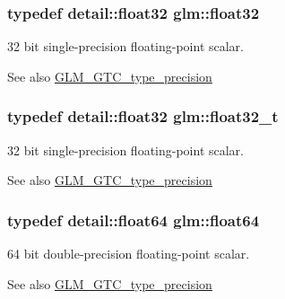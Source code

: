 \subsubsection[{float32}]{\setlength{\rightskip}{0pt plus 5cm}typedef detail\+::float32 {\bf glm\+::float32}}\label{group__gtc__type__precision_ga814f2f65354b6588b067cc5c67a6b340}
32 bit single-\/precision floating-\/point scalar. \begin{DoxySeeAlso}{See also}
\hyperlink{group__gtc__type__precision}{G\+L\+M\+\_\+\+G\+T\+C\+\_\+type\+\_\+precision} 
\end{DoxySeeAlso}
\hypertarget{group__gtc__type__precision_ga642737ae3e7c434b366f2191e6944bf2}{}
\subsubsection[{float32\+\_\+t}]{\setlength{\rightskip}{0pt plus 5cm}typedef detail\+::float32 {\bf glm\+::float32\+\_\+t}}\label{group__gtc__type__precision_ga642737ae3e7c434b366f2191e6944bf2}
32 bit single-\/precision floating-\/point scalar. \begin{DoxySeeAlso}{See also}
\hyperlink{group__gtc__type__precision}{G\+L\+M\+\_\+\+G\+T\+C\+\_\+type\+\_\+precision} 
\end{DoxySeeAlso}
\hypertarget{group__gtc__type__precision_gab721f828b41f46b20cf4883b50733d3b}{}
\subsubsection[{float64}]{\setlength{\rightskip}{0pt plus 5cm}typedef detail\+::float64 {\bf glm\+::float64}}\label{group__gtc__type__precision_gab721f828b41f46b20cf4883b50733d3b}
64 bit double-\/precision floating-\/point scalar. \begin{DoxySeeAlso}{See also}
\hyperlink{group__gtc__type__precision}{G\+L\+M\+\_\+\+G\+T\+C\+\_\+type\+\_\+precision} 
\end{DoxySeeAlso}
\hypertarget{group__gtc__type__precision_gade966a3eb25ebeb16dd53c40d3fdeb46}{}
